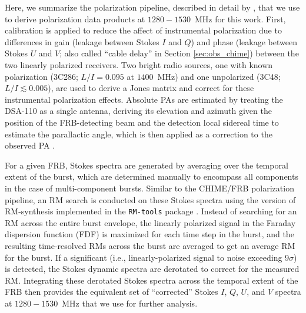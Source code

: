 \documentclass[twocolumn, linenumbers]{aastex701}
\begin{document}
Here, we summarize the polarization pipeline, described in detail by \cite{2024ApJ...964..131S}, that we use to derive polarization data products at $1280-1530$~MHz for this work. First, calibration is applied to reduce the affect of instrumental polarization due to differences in gain (leakage between Stokes $I$ and $Q$) and phase (leakage between Stokes $U$ and $V$; also called ``cable delay'' in Section \ref{sec:obs_chime}) between the two linearly polarized receivers. Two bright radio sources, one with known polarization (3C286; $L/I = 0.095$ at $1400$~MHz) and one unpolarized (3C48; $L/I \lesssim 0.005$), are used to derive a Jones matrix and correct for these instrumental polarization effects. Absolute PAs are estimated by treating the DSA-110 as a single antenna, deriving its elevation and azimuth given the position of the FRB-detecting beam and the detection local sidereal time to estimate the parallactic angle, which is then applied as a correction to the observed PA \citep[for further details regarding the polarization calibration, see Appendices D$-$G by][]{2024ApJ...964..131S}.

For a given FRB, Stokes spectra are generated by averaging over the temporal extent of the burst, which are determined manually to encompass all components in the case of multi-component bursts. Similar to the CHIME/FRB polarization pipeline, an RM search is conducted on these Stokes spectra using the version of RM-synthesis implemented in the {\tt RM-tools} package \citep{2005A&A...441.1217B, 2020ascl.soft05003P, 2026arXiv260120092V}. Instead of searching for an RM across the entire burst envelope, the linearly polarized signal in the Faraday dispersion function (FDF) is maximized for each time step in the burst, and the resulting time-resolved RMs across the burst are averaged to get an average RM for the burst. If a significant (i.e., linearly-polarized signal to noise exceeding $9\sigma$) is detected, the Stokes dynamic spectra are derotated to correct for the measured RM. Integrating these derotated Stokes spectra across the temporal extent of the FRB then provides the equivalent set of ``corrected'' Stokes $I$, $Q$, $U$, and $V$ spectra at $1280-1530$~MHz that we use for further analysis.
\end{document}
